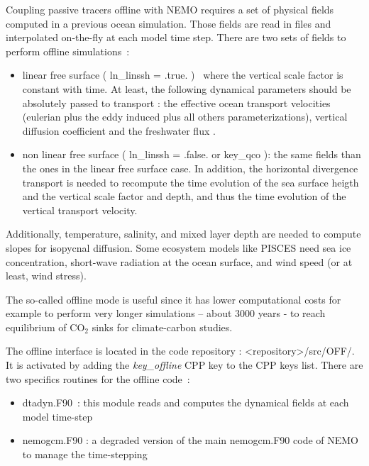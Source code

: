 \documentclass[../main/TOP_manual]{subfiles}
\begin{document}
Coupling passive tracers offline with NEMO requires a set of physical fields computed in a previous ocean simulation.
Those fields are read in files and interpolated on-the-fly at each model time step.
There are two sets of fields to perform offline simulations :

\begin{itemize}
        \item linear free surface ( ln\_linssh = .true. )  where the vertical scale factor is constant with time. At least, the following dynamical parameters should be absolutely passed
        to transport : the effective ocean transport velocities (eulerian plus the eddy induced plus all others parameterizations), vertical diffusion coefficient and the freshwater flux
.
        \item non linear free surface ( ln\_linssh = .false. or key\_qco ): the same fields than the ones in the linear free surface case. In addition, the horizontal divergence transport is needed to  recompute the time evolution of the sea surface heigth and the vertical scale factor and depth, and thus the time evolution of the vertical transport velocity.
\end{itemize}

Additionally, temperature, salinity, and mixed layer depth are needed to compute slopes for isopycnal diffusion. Some ecosystem models like PISCES need sea ice concentration, short-wave radiation at the ocean surface, and wind speed (or at least, wind stress).

The so-called offline mode is useful since it has lower computational costs for example to perform very longer simulations – about 3000 years - to reach equilibrium of CO$_{2}$ sinks for climate-carbon studies.

The offline interface is located in the code repository : <repository>/src/OFF/. It is activated by adding the\textit{ key\_offline} CPP key to the CPP keys list.
There are two specifics routines for the offline code :
\begin{itemize}
        \item dtadyn.F90 : this module reads and computes the dynamical fields at
each model time-step
        \item nemogcm.F90 : a degraded version of the main nemogcm.F90 code of NEMO to
manage the time-stepping
\end{itemize}
\end{document}
